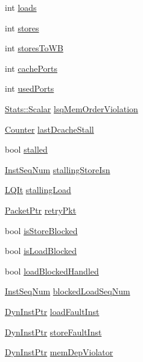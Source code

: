 \begin{DoxyCompactItemize}
int \hyperlink{classOzoneLWLSQ_a867971f18e464abd16193e069c64a8ad}{loads}
\item 
int \hyperlink{classOzoneLWLSQ_ade9e895aa9c5ace27779c985c4f43326}{stores}
\item 
int \hyperlink{classOzoneLWLSQ_a3831a7965ffbe90df177026988476f9c}{storesToWB}
\item 
int \hyperlink{classOzoneLWLSQ_ab2e23636971c40e7ed945026b2a184e1}{cachePorts}
\item 
int \hyperlink{classOzoneLWLSQ_a03435d626b7567ed154de5d7d8c3d419}{usedPorts}
\item 
\hyperlink{classStats_1_1Scalar}{Stats::Scalar} \hyperlink{classOzoneLWLSQ_ac499fc2b461e03a110deae7c695f75bc}{lsqMemOrderViolation}
\item 
\hyperlink{base_2types_8hh_ae1475755791765b8e6f6a8bb091e273e}{Counter} \hyperlink{classOzoneLWLSQ_a8b4696062ef09ab956804a7a99491853}{lastDcacheStall}
\item 
bool \hyperlink{classOzoneLWLSQ_a6f8bff553ad30865c7d0c62e05421eb8}{stalled}
\item 
\hyperlink{inst__seq_8hh_a258d93d98edaedee089435c19ea2ea2e}{InstSeqNum} \hyperlink{classOzoneLWLSQ_afe1cdcfca6b44c28581d862228adc3da}{stallingStoreIsn}
\item 
\hyperlink{classOzoneLWLSQ_a363c8c15e054d23b34f72063429933b8}{LQIt} \hyperlink{classOzoneLWLSQ_a567a64b358df6ae6162124cfe4d00db3}{stallingLoad}
\item 
\hyperlink{classPacket}{PacketPtr} \hyperlink{classOzoneLWLSQ_a314ae93c04b3ca96e79e1b1f39a8e478}{retryPkt}
\item 
bool \hyperlink{classOzoneLWLSQ_a89d931c74b63e0b0e7ad856fe9525ff6}{isStoreBlocked}
\item 
bool \hyperlink{classOzoneLWLSQ_a95dc31b4ce3ebcb6b9d75a510b3a128c}{isLoadBlocked}
\item 
bool \hyperlink{classOzoneLWLSQ_a2c1620029c162c7180e523b089e56ed5}{loadBlockedHandled}
\item 
\hyperlink{inst__seq_8hh_a258d93d98edaedee089435c19ea2ea2e}{InstSeqNum} \hyperlink{classOzoneLWLSQ_a3fca34b247fd8d081557578f8ca60fe3}{blockedLoadSeqNum}
\item 
\hyperlink{classOzoneLWLSQ_a028ce10889c5f6450239d9e9a7347976}{DynInstPtr} \hyperlink{classOzoneLWLSQ_a7123aa8b10829cc4712dff5454e13978}{loadFaultInst}
\item 
\hyperlink{classOzoneLWLSQ_a028ce10889c5f6450239d9e9a7347976}{DynInstPtr} \hyperlink{classOzoneLWLSQ_ab98cf7d5235b7402e8916e78569f4ab2}{storeFaultInst}
\item 
\hyperlink{classOzoneLWLSQ_a028ce10889c5f6450239d9e9a7347976}{DynInstPtr} \hyperlink{classOzoneLWLSQ_a270a20c3fa52139e0538288275db9d22}{memDepViolator}
\end{DoxyCompactItemize}


